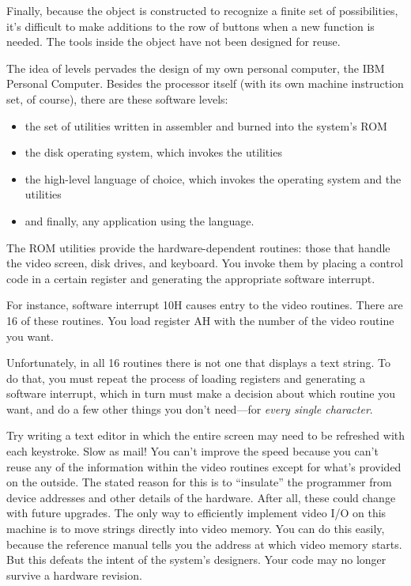 
Finally, because the object is constructed to recognize a finite set
of possibilities, it's difficult to make additions to the row of
buttons when a new function is needed. The tools inside the object
have not been designed for reuse.

The idea of levels pervades the design of my own personal computer,
the IBM Personal Computer. Besides the processor itself (with its own
machine instruction set, of course), there are these software levels:

\begin{itemize}
	\item the set of utilities written in assembler and burned into the system's ROM
	\item the disk operating system, which invokes the utilities
	\item the high-level language of choice, which invokes the operating system and
	the utilities
	\item and finally, any application using the language.
\end{itemize}

The ROM utilities provide the hardware-dependent routines: those that
handle the video screen, disk drives, and keyboard. You invoke them by
placing a control code in a certain register and generating the appropriate
software interrupt.

For instance, software interrupt 10H causes entry to the video
routines. There are 16 of these routines. You load register AH with the
number of the video routine you want.

Unfortunately, in all 16 routines there is not one that displays a text
string. To do that, you must repeat the process of loading registers and
generating a software interrupt, which in turn must make a decision
about which routine you want, and do a few other things you don't
need---for \emph{every single character}.

Try writing a text editor in which the entire screen may need to be
refreshed with each keystroke. Slow as mail! You can't improve the speed
because you can't reuse any of the information within the video routines
except for what's provided on the outside. The stated reason for this is to
``insulate'' the programmer from device addresses and other details of
the hardware. After all, these could change with future upgrades.
The only way to efficiently implement video I/O on this machine is
to move strings directly into video memory. You can do this easily,
because the reference manual tells you the address at which video
memory starts. But this defeats the intent of the system's designers.
Your code may no longer survive a hardware revision.

